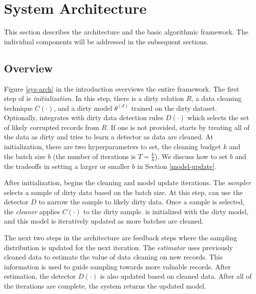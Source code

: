 \section{System Architecture}\label{arch}
This section describes the \sys architecture and the basic algorithmic framework.
The individual components will be addressed in the subsequent sections.

\subsection{Overview}
Figure \ref{sys-arch} in the introduction overviews the entire framework.
The first step of \sys is \emph{initialization}.
In this step, there is a dirty relation $R$, a data cleaning technique $C(\cdot)$, and a dirty model $\theta^{(d)}$ trained on the dirty dataset. 
Optionally, \sys integrates with dirty data detection rules $D(\cdot)$ which selects the set of likely corrupted records from $R$.
If one is not provided, \sys starts by treating all of the data as dirty and tries to learn a detector as data are cleaned.
At initialization, there are two hyperparameters to set, the cleaning budget $k$ and the batch size $b$ (the number of iterations is $T = \frac{k}{b}$).
We discuss how to set $b$ and the tradeoffs in setting a larger or smaller $b$ in Section \ref{model-update}.

After initialization, \sys begins the cleaning and model update iterations.
The \emph{sampler} selects a sample of dirty data based on the batch size.
At this step, \sys can use the detector $D$ to narrow the sample to likely dirty data.
Once a sample is selected, the \emph{cleaner} applies $C(\cdot)$ to the dirty sample.
\sys is initialized with the dirty model, and this model is iteratively updated as more batches are cleaned.

The next two steps in the architecture are feedback steps where the sampling distribution is updated for the next iteration.
The \emph{estimator} uses previously cleaned data to estimate the value of data cleaning on new records.
This information is used to guide sampling towards more valuable records.
After estimation, the detector $D(\cdot)$ is also updated based on cleaned data.
After all of the iterations are complete, the system returns the updated model.

